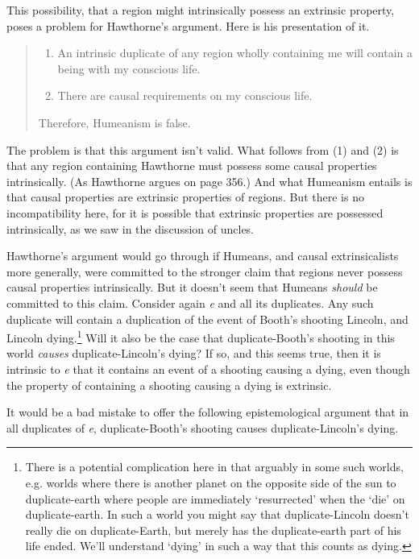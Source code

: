 This possibility, that a region might intrinsically possess an extrinsic property, poses a problem for Hawthorne's argument. Here is his presentation of it.

\begin{quote}
\begin{enumerate}
\renewcommand{\labelenumi}{(\arabic{enumi})}
\item An intrinsic duplicate of any region wholly containing me will contain a being with my conscious life.
\item There are causal requirements on my conscious life.
\end{enumerate}
\noindent Therefore, Humeanism is false. \cite[351-352]{Hawthorne2004-Humeans}
\end{quote}

\noindent The problem is that this argument isn't valid. What follows from (1) and (2) is that any region containing Hawthorne must possess some causal properties intrinsically. (As Haw\-th\-orne argues on page 356.) And what Humeanism entails is that causal properties are extrinsic properties of regions. But there is no incompatibility here, for it is possible that extrinsic properties are possessed intrinsically, as we saw in the discussion of uncles.

Hawthorne's argument would go through if Humeans, and causal extrinsicalists more generally, were committed to the stronger claim that regions never possess causal properties intrinsically. But it doesn't seem that Humeans \textit{should} be committed to this claim. Consider again \textit{e} and all its duplicates. Any such duplicate will contain a duplication of the event of Booth's shooting Lincoln, and Lincoln dying.\footnote{There is a potential complication here in that arguably in some such worlds, e.g. worlds where there is another planet on the opposite side of the sun to duplicate-earth where people are immediately `resurrected' when the `die' on duplicate-earth. In such a world you might say that duplicate-Lincoln doesn't really die on duplicate-Earth, but merely has the duplicate-earth part of his life ended. We'll understand `dying' in such a way that this counts as dying.} Will it also be the case that duplicate-Booth's shooting in this world \textit{causes} duplicate-Lincoln's dying? If so, and this seems true, then it is intrinsic to \textit{e} that it contains an event of a shooting causing a dying, even though the property of containing a shooting causing a dying is extrinsic.

It would be a bad mistake to offer the following epistemological argument that in all duplicates of \textit{e}, duplicate-Booth's shooting causes duplicate-Lincoln's dying. 

